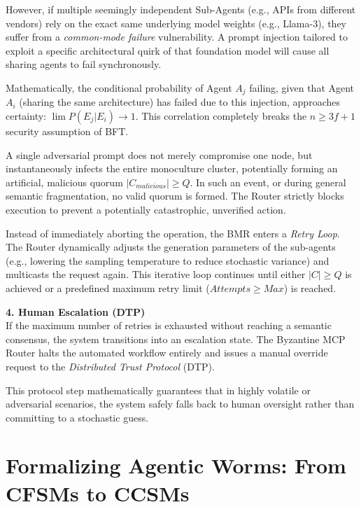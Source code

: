 \documentclass[a4paper,11pt,twocolumn]{article}
\theoremstyle{definition}
\theoremstyle{plain}
\begin{document}
However, if multiple seemingly independent Sub-Agents (e.g., APIs from different vendors) rely on the exact same underlying model weights (e.g., Llama-3), they suffer from a \textit{common-mode failure} vulnerability. A prompt injection tailored to exploit a specific architectural quirk of that foundation model will cause all sharing agents to fail synchronously. 

\pagebreak

Mathematically, the conditional probability of Agent $A_j$ failing, given that Agent $A_i$ (sharing the same architecture) has failed due to this injection, approaches certainty: $\lim P(E_j | E_i) \to 1$. This correlation completely breaks the $n \ge 3f + 1$ security assumption of BFT.

A single adversarial prompt does not merely compromise one node, but instantaneously infects the entire monoculture cluster, potentially forming an artificial, malicious quorum $|C_{malicious}| \ge Q$.
In such an event, or during general semantic fragmentation, no valid quorum is formed.
The Router strictly blocks execution to prevent a potentially catastrophic, unverified action.

Instead of immediately aborting the operation, the BMR enters a \textit{Retry Loop}. The Router dynamically adjusts the generation parameters of the sub-agents (e.g., lowering the sampling temperature to reduce stochastic variance) and multicasts the request again. This iterative loop continues until either $|C| \ge Q$ is achieved or a predefined maximum retry limit ($Attempts \ge Max$) is reached.

\textbf{4. Human Escalation (DTP)} \\
If the maximum number of retries is exhausted without reaching a semantic consensus, the system transitions into an escalation state. The Byzantine MCP Router halts the automated workflow entirely and issues a manual override request to the \textit{Distributed Trust Protocol} (DTP).


This protocol step mathematically guarantees that in highly volatile or adversarial scenarios, the system safely falls back to human oversight rather than committing to a stochastic guess.

\section{Formalizing Agentic Worms: From CFSMs to CCSMs}
\end{document}
